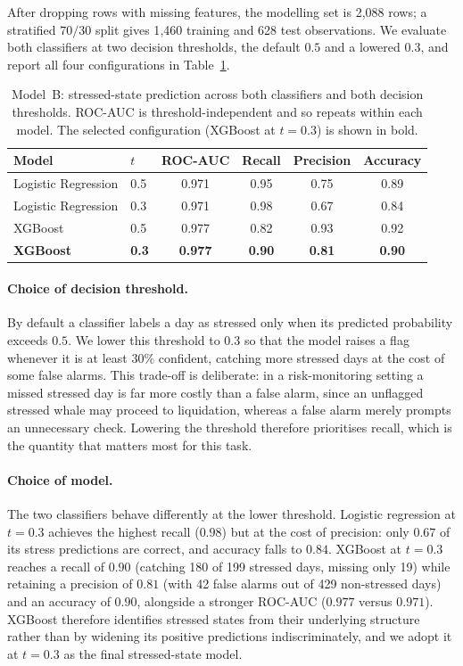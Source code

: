After dropping rows with missing features, the modelling set is 2{,}088
rows; a stratified $70/30$ split gives 1{,}460 training and 628 test
observations. We evaluate both classifiers at two decision thresholds,
the default $0.5$ and a lowered $0.3$, and report all four
configurations in Table~\ref{tab:model-b}.

\begin{table}[t]
\centering
\caption{Model~B: stressed-state prediction across both classifiers and
both decision thresholds. ROC-AUC is threshold-independent and so repeats
within each model. The selected configuration (XGBoost at $t=0.3$) is
shown in bold.}
\label{tab:model-b}
\begin{tabular}{llcccc}
\hline
Model & $t$ & ROC-AUC & Recall & Precision & Accuracy \\
\hline
Logistic Regression & 0.5 & 0.971 & 0.95 & 0.75 & 0.89 \\
Logistic Regression & 0.3 & 0.971 & 0.98 & 0.67 & 0.84 \\
XGBoost             & 0.5 & 0.977 & 0.82 & 0.93 & 0.92 \\
\textbf{XGBoost}    & \textbf{0.3} & \textbf{0.977} & \textbf{0.90} & \textbf{0.81} & \textbf{0.90} \\
\hline
\end{tabular}
\end{table}

\paragraph{Choice of decision threshold.}
By default a classifier labels a day as stressed only when its predicted
probability exceeds $0.5$. We lower this threshold to $0.3$ so that the
model raises a flag whenever it is at least $30\%$ confident, catching
more stressed days at the cost of some false alarms. This trade-off is
deliberate: in a risk-monitoring setting a missed stressed day is far
more costly than a false alarm, since an unflagged stressed whale may
proceed to liquidation, whereas a false alarm merely prompts an
unnecessary check. Lowering the threshold therefore prioritises recall,
which is the quantity that matters most for this task.

\paragraph{Choice of model.}
The two classifiers behave differently at the lower threshold. Logistic
regression at $t=0.3$ achieves the highest recall ($0.98$) but at the
cost of precision: only $0.67$ of its stress predictions are correct, and
accuracy falls to $0.84$. XGBoost at $t=0.3$ reaches a recall of $0.90$
(catching 180 of 199 stressed days, missing only 19) while retaining a
precision of $0.81$ (with 42 false alarms out of 429 non-stressed days)
and an accuracy of $0.90$, alongside a stronger ROC-AUC ($0.977$ versus
$0.971$). XGBoost therefore identifies stressed states from their
underlying structure rather than by widening its positive predictions
indiscriminately, and we adopt it at $t=0.3$ as the final stressed-state
model.

